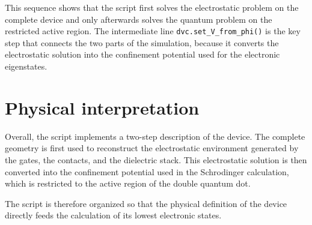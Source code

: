 This sequence shows that the script first solves the electrostatic problem on the complete device and only afterwards solves the quantum problem on the restricted active region. The intermediate line \texttt{dvc.set\_V\_from\_phi()} is the key step that connects the two parts of the simulation, because it converts the electrostatic solution into the confinement potential used for the electronic eigenstates.

\section{Physical interpretation}
Overall, the script implements a two-step description of the device. The complete geometry is first used to reconstruct the electrostatic environment generated by the gates, the contacts, and the dielectric stack. This electrostatic solution is then converted into the confinement potential used in the Schrodinger calculation, which is restricted to the active region of the double quantum dot.

The script is therefore organized so that the physical definition of the device directly feeds the calculation of its lowest electronic states.
